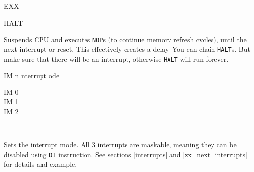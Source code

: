 \begin{basedescript}{
    \desclabelstyle{\multilinelabel}
    \desclabelwidth{3cm}}
\begin{DetailItem}{EXX}
        \begin{DetailTiming}
        \end{DetailTiming}

    \end{DetailItem}

    \pagebreak
    \begin{DetailItem}{HALT}
        {}
        {}

        Suspends CPU and executes {\tt NOP}s (to continue memory refresh cycles), until the next interrupt or reset. This effectively creates a delay. You can chain {\tt HALT}s. But make sure that there will be an interrupt, otherwise {\tt HALT} will run forever.

        \begin{DetailEffects}
            \FlagsHALT
        \end{DetailEffects}
						
        \begin{DetailTiming}
        \end{DetailTiming}

    \end{DetailItem}

    \begin{DetailItem}{IM n}
        {nterrupt ode}
        {}

        \begin{DetailVariants}[1]
            IM 0\\
            IM 1\\
            IM 2
			
            \columnbreak
            ~
        \end{DetailVariants}

        Sets the interrupt mode. All 3 interrupts are maskable, meaning they can be disabled using {\tt DI} instruction. See sections \ref{interrupts} and \ref{zx_next_interrupts} for details and example.

        \begin{DetailEffects}
            \FlagsIM		
        \end{DetailEffects}

        \begin{DetailTiming}
        \end{DetailTiming}

    \end{DetailItem}


\end{basedescript}
